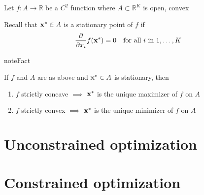 \documentclass[letterpaper,10pt,english]{jupyterBook}
\begin{document}
\sphinxAtStartPar
Let \(f \colon A \to \mathbb{R}\) be a \(C^2\) function where \(A \subset \mathbb{R}^K\)
is open, convex

\sphinxAtStartPar
Recall that \({\bf x}^* \in A\) is a stationary point of \(f\) if
\begin{equation*}
\begin{split}
%
\frac{\partial}{\partial x_i} 
f({\bf x}^*)
= 0
\quad \text{for all $i$ in } 1, \ldots, K
%
\end{split}
\end{equation*}
\begin{sphinxadmonition}{note}{Fact}

\sphinxAtStartPar
If \(f\) and \(A\) are as above and \({\bf x}^* \in A\) is stationary, then
\begin{enumerate}
%
\item {} 
\sphinxAtStartPar
\(f\) strictly concave \(\implies\) \({\bf x}^*\) is the unique maximizer of \(f\) on \(A\)

\item {} 
\sphinxAtStartPar
\(f\) strictly convex \(\implies\) \({\bf x}^*\) is the unique
minimizer of \(f\) on \(A\)

\end{enumerate}
\end{sphinxadmonition}

\begin{figure}[htbp]
\centering

\noindent{}
\end{figure}

\sphinxstepscope


\chapter{Unconstrained optimization}
\label{\detokenize{07.unconstrained:unconstrained-optimization}}\label{\detokenize{07.unconstrained::doc}}



\sphinxstepscope


\chapter{Constrained optimization}
\label{\detokenize{08.constrained:constrained-optimization}}\label{\detokenize{08.constrained::doc}}
\end{document}
